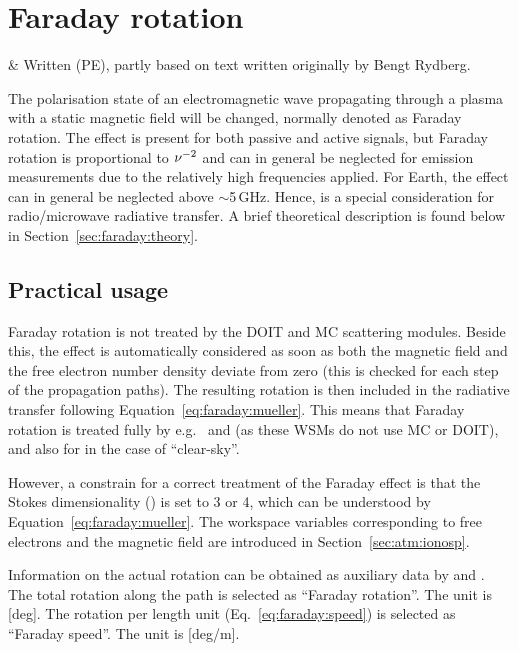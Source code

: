 \chapter{Faraday rotation}
 \label{sec:faraday}

 & Written (PE), partly based on text written originally by 
          Bengt Rydberg.
\stophistory

The polarisation state of an electromagnetic wave propagating through a plasma
with a static magnetic field will be changed, normally denoted as Faraday
rotation. The effect is present for both passive and active signals, but
Faraday rotation is proportional to $\nu^{-2}$ and can in general be neglected
for emission measurements due to the relatively high frequencies applied. For
Earth, the effect can in general be neglected above
$\sim$5\,GHz. Hence,  is a special consideration
for radio/microwave radiative transfer. A brief theoretical description is
found below in Section~\ref{sec:faraday:theory}. 



\section{Practical usage}
\label{sec:faraday:arts}
%
Faraday rotation is not treated by the DOIT and MC scattering modules.
Beside this, the effect is automatically considered as soon as both the
magnetic field and the free electron number density deviate from zero (this is
checked for each step of the propagation paths). The resulting
rotation is then included in the radiative transfer following
Equation~\ref{eq:faraday:mueller}. This means that Faraday rotation is treated
fully by e.g.\  and
 (as these WSMs do not use MC or DOIT), and also for 
 in the case of ``clear-sky''. 

However, a constrain for a correct treatment of the Faraday effect is that the
Stokes dimensionality () is set to 3 or 4, which can be
understood by Equation~\ref{eq:faraday:mueller}. The workspace variables
corresponding to free electrons and the magnetic field are introduced in
Section~\ref{sec:atm:ionosp}.

Information on the actual rotation can be obtained as auxiliary data by
 and . The total
rotation along the path is selected as ``Faraday rotation''. The unit is [deg].
The rotation per length unit (Eq.~\ref{eq:faraday:speed}) is selected as
``Faraday speed''. The unit is [deg/m].




